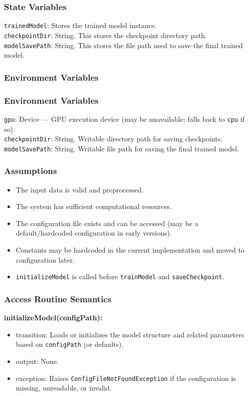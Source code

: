 \documentclass[12pt, titlepage]{article}
\begin{document}
\subsubsection{State Variables}
\texttt{trainedModel}: Stores the trained model instance.\\
\texttt{checkpointDir}: String. This stores the checkpoint directory path.\\
\texttt{modelSavePath}: String. This stores the file path used to save the final trained model.


\subsubsection{Environment Variables}
\subsubsection{Environment Variables}
\texttt{gpu}: Device — GPU execution device (may be unavailable; falls back to \texttt{cpu} if so).\\
\texttt{checkpointDir}: String. Writable directory path for saving checkpoints.\\
\texttt{modelSavePath}: String. Writable file path for saving the final trained model.

\subsubsection{Assumptions}
\begin{itemize}
  \item The input data is valid and preprocessed.
  \item The system has sufficient computational resources.
  \item The configuration file exists and can be accessed (may be a default/hardcoded configuration in early versions).
  \item Constants may be hardcoded in the current implementation and moved to configuration later.
  \item \texttt{initializeModel} is called before \texttt{trainModel} and \texttt{saveCheckpoint}.

\end{itemize}

\subsubsection{Access Routine Semantics}

\noindent \textbf{initializeModel(configPath):}
\begin{itemize}
  \item transition: Loads or initializes the model structure and related parameters based on \texttt{configPath} (or defaults).
  \item output: None.
  \item exception: Raises \texttt{ConfigFileNotFoundException} if the configuration is missing, unreadable, or invalid.
\end{itemize}
\end{document}
